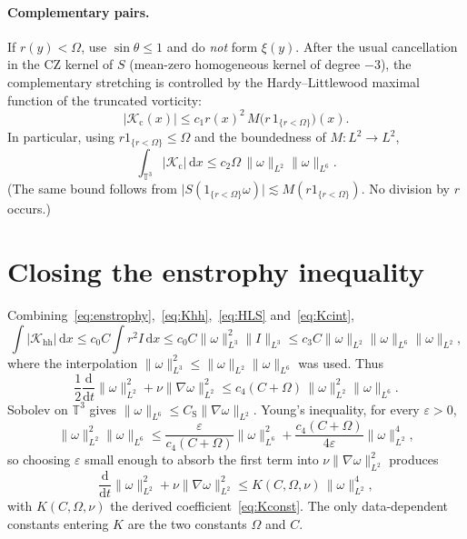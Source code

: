 \documentclass[11pt,a4paper]{article}
\theoremstyle{definition}
\theoremstyle{remark}
\newcommand{\T}{\mathbb{T}}
\newcommand{\abs}[1]{\lvert#1\rvert}
\newcommand{\norm}[1]{\lVert#1\rVert}
\newcommand{\dd}{\mathrm{d}}
\begin{document}
\paragraph{Complementary pairs.}
If \(r(y)<\Omega\), use \(\sin\theta\le 1\) and do \emph{not} form \(\xi(y)\).
After the usual cancellation in the CZ kernel of \(S\) (mean-zero
homogeneous kernel of degree \(-3\)), the complementary stretching is
controlled by the Hardy--Littlewood maximal function of the truncated
vorticity:
\begin{equation}
\label{eq:Kc}
\abs{\mathcal K_{\mathrm{c}}(x)}\le c_1 r(x)^2\,M\bigl(r\,1_{\{r<\Omega\}}\bigr)(x).
\end{equation}
In particular, using \(r1_{\{r<\Omega\}}\le\Omega\) and the boundedness of
\(M:L^2\to L^2\),
\begin{equation}
\label{eq:Kcint}
\int_{\T^3}\abs{\mathcal K_{\mathrm{c}}}\,\dd x
\le c_2\Omega\,\norm{\omega}_{L^2}\norm{\omega}_{L^6}.
\end{equation}
(The same bound follows from \(\abs{S(1_{\{r<\Omega\}}\omega)}\lesssim
M(r1_{\{r<\Omega\}})\). No division by \(r\) occurs.)

\section{Closing the enstrophy inequality}

Combining~\eqref{eq:enstrophy},~\eqref{eq:Khh},~\eqref{eq:HLS} and~\eqref{eq:Kcint},
\[
\int\abs{\mathcal K_{\mathrm{hh}}}\,\dd x
\le c_0 C\int r^2 I\,\dd x
\le c_0 C\norm{\omega}_{L^3}^2\norm{I}_{L^3}
\le c_3 C\norm{\omega}_{L^2}\norm{\omega}_{L^6}\norm{\omega}_{L^2},
\]
where the interpolation \(\norm{\omega}_{L^3}^2\le\norm{\omega}_{L^2}\norm{\omega}_{L^6}\)
was used. Thus
\begin{equation}
\label{eq:enst2}
\frac12\frac{\dd}{\dd t}\norm{\omega}_{L^2}^2+\nu\norm{\nabla\omega}_{L^2}^2
\le c_4(C+\Omega)\,\norm{\omega}_{L^2}^2\norm{\omega}_{L^6}.
\end{equation}
Sobolev on \(\T^3\) gives \(\norm{\omega}_{L^6}\le C_{\mathrm{S}}\norm{\nabla\omega}_{L^2}\).
Young's inequality, for every \(\varepsilon>0\),
\[
\norm{\omega}_{L^2}^2\norm{\omega}_{L^6}
\le \frac{\varepsilon}{c_4(C+\Omega)}\norm{\omega}_{L^6}^2
+\frac{c_4(C+\Omega)}{4\varepsilon}\norm{\omega}_{L^2}^4,
\]
so choosing \(\varepsilon\) small enough to absorb the first term into
\(\nu\norm{\nabla\omega}_{L^2}^2\) produces
\begin{equation}
\label{eq:gronwall}
\frac{\dd}{\dd t}\norm{\omega}_{L^2}^2
+\nu\norm{\nabla\omega}_{L^2}^2
\le K(C,\Omega,\nu)\,\norm{\omega}_{L^2}^4,
\end{equation}
with \(K(C,\Omega,\nu)\) the derived coefficient~\eqref{eq:Kconst}. The
only data-dependent constants entering \(K\) are the two constants
\(\Omega\) and \(C\).
\end{document}

